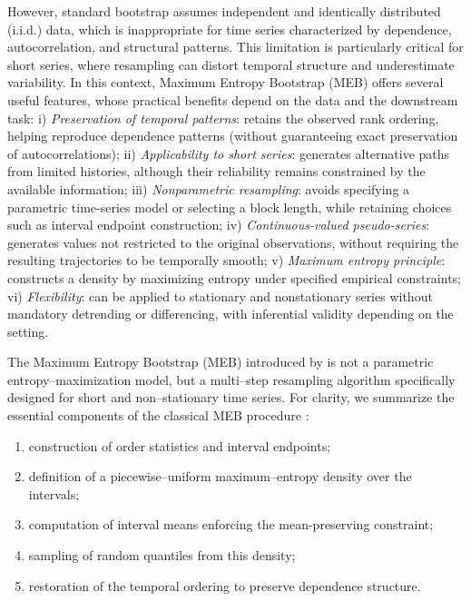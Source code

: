 \documentclass[mnsc,sglanonrev]{informs4}  %
\theoremstyle{remark}\newtheorem{remark}{Remark}
\begin{document}
However, standard bootstrap assumes independent and identically distributed (i.i.d.) data, which is inappropriate for time series characterized by dependence, autocorrelation, and structural patterns. This limitation is particularly critical for short series, where resampling can distort temporal structure and underestimate variability. In this context, Maximum Entropy Bootstrap (MEB) offers several useful features, whose practical benefits depend on the data and the downstream task:
i) {\em Preservation of temporal patterns}: retains the observed rank ordering, helping reproduce dependence patterns (without guaranteeing exact preservation of autocorrelations);
ii) {\em Applicability to short series}: generates alternative paths from limited histories, although their reliability remains constrained by the available information;
iii) {\em Nonparametric resampling}: avoids specifying a parametric time-series model or selecting a block length, while retaining choices such as interval endpoint construction;
iv) {\em Continuous-valued pseudo-series}: generates values not restricted to the original observations, without requiring the resulting trajectories to be temporally smooth;
v) {\em Maximum entropy principle}: constructs a density by maximizing entropy under specified empirical constraints;
vi) {\em Flexibility}: can be applied to stationary and nonstationary series without mandatory detrending or differencing, with inferential validity depending on the setting.

The Maximum Entropy Bootstrap (MEB) introduced by \cite{Vinod2004} is not a parametric entropy–maximization model, but a multi–step resampling algorithm specifically designed for short and non–stationary time series. For clarity, we summarize the essential components of the classical MEB procedure \cite{VL09}:

\begin{enumerate}
    \item construction of order statistics and interval endpoints;
    \item definition of a piecewise–uniform maximum–entropy density over the intervals;
    \item computation of interval means enforcing the mean-preserving constraint;
    \item sampling of random quantiles from this density;
    \item restoration of the temporal ordering to preserve dependence structure.
\end{enumerate}
\end{document}
